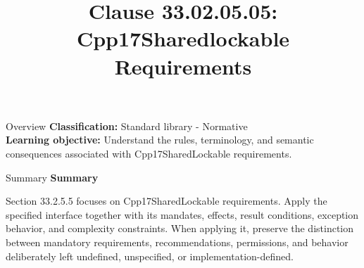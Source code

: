 \documentclass[10pt,letterpaper]{article}
\title{Clause 33.02.05.05: Cpp17Sharedlockable Requirements}
\author{}
\date{}
\begin{document}
\maketitle
\begin{CornellOverviewBox}{Overview}
\textbf{Classification:} Standard library - Normative\\[2pt]
\textbf{Learning objective:} Understand the rules, terminology, and semantic consequences associated with Cpp17SharedLockable requirements.
\end{CornellOverviewBox}\begin{CornellSummaryBox}{Summary}
{\sffamily\bfseries\color{Accent} Summary}\par\vspace{3pt}Section 33.2.5.5 focuses on Cpp17SharedLockable requirements. Apply the specified interface together with its mandates, effects, result conditions, exception behavior, and complexity constraints. When applying it, preserve the distinction between mandatory requirements, recommendations, permissions, and behavior deliberately left undefined, unspecified, or implementation-defined.
\end{CornellSummaryBox}
\end{document}
